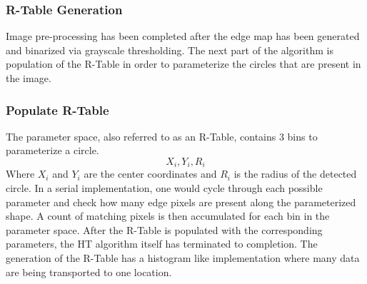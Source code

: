 \documentclass[conference]{IEEEtran}
\begin{document}
\subsubsection{R-Table Generation}
Image pre-processing has been completed after the edge map has been generated and binarized via grayscale thresholding.
The next part of the algorithm is population of the R-Table in order to parameterize the circles that are present in the image.
\subsubsection{Populate R-Table}
The parameter space, also referred to as an R-Table, contains 3 bins to parameterize a circle.
\begin{equation}
  X_{i}, Y_{i}, R_{i}\label{circle-parameters}
\end{equation}
Where $X_i$ and $Y_i$ are the center coordinates and $R_i$ is the radius of the detected circle.
In a serial implementation, one would cycle through each possible parameter and check how many edge pixels are present along the parameterized shape. 
A count of matching pixels is then accumulated for each bin in the parameter space.
After the R-Table is populated with the corresponding parameters, the HT algorithm itself has terminated to completion.
The generation of the R-Table has a histogram like implementation where many data are being transported to one location.
\end{document}
